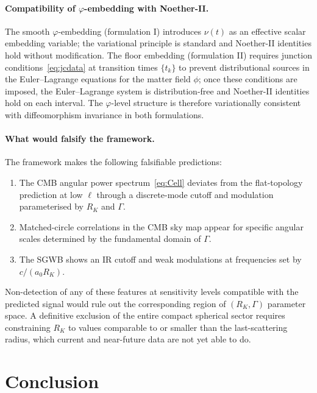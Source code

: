 \documentclass[12pt,a4paper]{article}
\newcommand{\RK}{R_K}
\newcommand{\nnu}{\nu}       %
\begin{document}
\paragraph{Compatibility of $\varphi$-embedding with Noether-II.}
The smooth $\varphi$-embedding (formulation I) introduces
$\nnu(t)$ as an effective scalar embedding variable; the
variational principle is standard and Noether-II identities
hold without modification. The floor embedding (formulation
II) requires junction conditions~\eqref{eq:jcdata} at
transition times $\{t_k\}$ to prevent distributional
sources in the Euler--Lagrange equations for the matter
field $\phi$; once these conditions are imposed, the
Euler--Lagrange system is distribution-free and Noether-II
identities hold on each interval. The $\varphi$-level
structure is therefore variationally consistent with
diffeomorphism invariance in both formulations.

\paragraph{What would falsify the framework.}
The framework makes the following falsifiable predictions:
\begin{enumerate}
\item[(a)] The CMB angular power spectrum~\eqref{eq:Cell}
  deviates from the flat-topology prediction at low $\ell$
  through a discrete-mode cutoff and modulation
  parameterised by $\RK$ and $\Gamma$.
\item[(b)] Matched-circle correlations in the CMB sky map
  appear for specific angular scales determined by the
  fundamental domain of $\Gamma$.
\item[(c)] The SGWB shows an IR cutoff and weak modulations
  at frequencies set by $c/(a_0\RK)$.
\end{enumerate}
Non-detection of any of these features at sensitivity
levels compatible with the predicted signal would rule out
the corresponding region of $(\RK, \Gamma)$ parameter
space. A definitive exclusion of the entire compact
spherical sector requires constraining $\RK$ to values
comparable to or smaller than the last-scattering radius,
which current and near-future data are not yet able to do.

\section{Conclusion}
\label{sec:conc}
\end{document}
